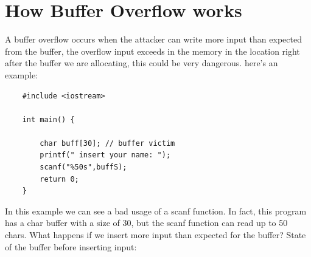 \documentclass{report}
\begin{document}
    \section{How Buffer Overflow works}
    A buffer overflow occurs when the attacker can write more input than expected from the buffer, the overflow input exceeds in the memory in the location right after the buffer we are allocating, this could be very dangerous.\newline
    here's an example:
    \begin{verbatim}
    #include <iostream>
    
    int main() {
    
        char buff[30]; // buffer victim 
        printf(" insert your name: ");
        scanf("%50s",buffS); 
        return 0;
    }
    \end{verbatim}
    In this example we can see a bad usage of a scanf function. In fact, this program has a char buffer with a size of 30, but the scanf function can read up to 50 chars.\newline 
    What happens if we insert more input than expected for the buffer?\newline
    State of the buffer before inserting input:
       
\end{document}
